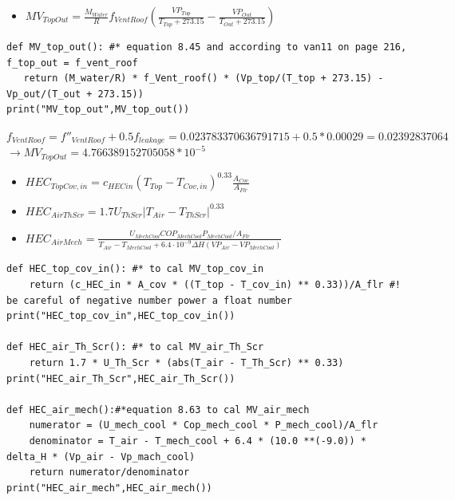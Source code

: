 \documentclass[a4paper]{article}
\numberwithin{equation}{section}
\begin{document}
\begin{itemize}
    \item $ MV_{TopOut}  = \frac{M_{Water}}{R} f_{VentRoof} \left(\frac{VP_{Top}}{T_{Top} + 273.15} - \frac{VP_{Out}}{T_{Out} + 273.15}\right)   $
\end{itemize}
\begin{mdframed}[leftline=false,rightline=false,backgroundcolor=cyan!10]
  \begin{verbatim}
def MV_top_out(): #* equation 8.45 and according to van11 on page 216, f_top_out = f_vent_roof
   return (M_water/R) * f_Vent_roof() * (Vp_top/(T_top + 273.15) - Vp_out/(T_out + 273.15))
print("MV_top_out",MV_top_out())
\end{verbatim}
\end{mdframed}
$f_{VentRoof} = f''_{VentRoof} + 0.5f_{leakage} = 0.023783370636791715 + 0.5*0.00029 = 0.02392837064$
$\rightarrow MV_{TopOut} = 4.766389152705058*10^{-5}$

\begin{itemize}
    \item $ HEC_{TopCov,in} = {c_{HECin} (T_{Top} - T_{Cov,in})}^{0.33} \frac{A_{Cov}}{A_{Flr}}$
    \item $ HEC_{AirThScr} = 1.7 U_{ThScr} |T_{Air} - T_{ThScr}|^{0.33}$
    \item $ HEC_{AirMech} = \frac{U_{MechCool} COP_{MechCool} P_{MechCool} / A_{Flr}}{T_{Air} - T_{MechCool} + 6.4 \cdot 10^{-9} \Delta H(VP_{Air} - VP_{MechCool})}  $
\end{itemize}
\begin{mdframed}[leftline=false,rightline=false,backgroundcolor=cyan!10]
  \begin{verbatim}
def HEC_top_cov_in(): #* to cal MV_top_cov_in
    return (c_HEC_in * A_cov * ((T_top - T_cov_in) ** 0.33))/A_flr #! be careful of negative number power a float number
print("HEC_top_cov_in",HEC_top_cov_in())

def HEC_air_Th_Scr(): #* to cal MV_air_Th_Scr
    return 1.7 * U_Th_Scr * (abs(T_air - T_Th_Scr) ** 0.33)
print("HEC_air_Th_Scr",HEC_air_Th_Scr())

def HEC_air_mech():#*equation 8.63 to cal MV_air_mech
    numerator = (U_mech_cool * Cop_mech_cool * P_mech_cool)/A_flr
    denominator = T_air - T_mech_cool + 6.4 * (10.0 **(-9.0)) * delta_H * (Vp_air - Vp_mach_cool)
    return numerator/denominator
print("HEC_air_mech",HEC_air_mech())
\end{verbatim}
\end{mdframed}
\end{document}
